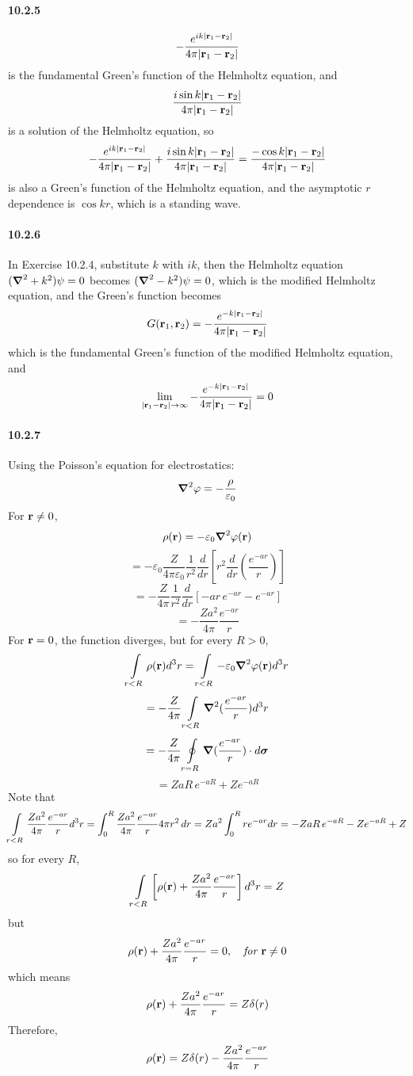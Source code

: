 \documentclass[a4paper]{article}
\begin{document}
\paragraph{10.2.5}
\[
-\frac{e^{ik|\mathbf{r}_1-\mathbf{r}_2|}}{4\pi|\mathbf{r}_1-\mathbf{r}_2|}
\]
is the fundamental Green's function of the Helmholtz equation, and
\[
\frac{i\sin k|\mathbf{r}_1-\mathbf{r}_2|}{4\pi|\mathbf{r}_1-\mathbf{r}_2|}\] 
is a solution of the Helmholtz equation, so
\[
-\frac{e^{ik|\mathbf{r}_1-\mathbf{r}_2|}}{4\pi|\mathbf{r}_1-\mathbf{r}_2|}+\frac{i\sin k|\mathbf{r}_1-\mathbf{r}_2|}{4\pi|\mathbf{r}_1-\mathbf{r}_2|}=\frac{-\cos k|\mathbf{r}_1-\mathbf{r}_2|}{4\pi|\mathbf{r}_1-\mathbf{r}_2|}
\]
is also a Green's function of the Helmholtz equation, and the asymptotic $r$ dependence is $\cos kr$, which is a standing wave.

\paragraph{10.2.6}
In Exercise 10.2.4, substitute $k$ with $ik$, then the Helmholtz equation $(\boldsymbol{\nabla}^2+k^2)\psi=0$ becomes $(\boldsymbol{\nabla}^2-k^2)\psi=0$, which is the modified Helmholtz equation, and the Green's function becomes 
\[
G(\mathbf{r}_1,\mathbf{r}_2)=-\frac{e^{-k|\mathbf{r}_1-\mathbf{r}_2|}}{4\pi|\mathbf{r}_1-\mathbf{r}_2|}
\]
which is the fundamental Green's function of the modified Helmholtz equation, and 
\[
\lim_{|\mathbf{r}_1-\mathbf{r}_2|\to\infty}-\frac{e^{-k|\mathbf{r}_1-\mathbf{r}_2|}}{4\pi|\mathbf{r}_1-\mathbf{r}_2|}=0
\]

\paragraph{10.2.7}
Using the Poisson's equation for electrostatics:
\[
\boldsymbol{\nabla}^2\varphi=-\frac{\rho}{\varepsilon_0}
\]
For $\mathbf{r}\neq0$, 
\[
\rho(\mathbf{r})=-\varepsilon_0\boldsymbol{\nabla}^2\varphi(\mathbf{r})
\]
\[=-\varepsilon_0\frac{Z}{4\pi\varepsilon_0}\frac{1}{r^2}\frac{d}{dr}\left[r^2\frac{d}{dr}(\frac{e^{-ar}}{r}) \right]
\]
\[
=-\frac{Z}{4\pi}\frac{1}{r^2}\frac{d}{dr}\left[-ar\,e^{-ar}-e^{-ar} \right]
\]
\[
=-\frac{Za^2}{4\pi}\frac{e^{-ar}}{r}
\]
For $\mathbf{r}=0$, the function diverges, but for every $R>0$,
\[
\int\displaylimits_{r<R}\rho(\mathbf{r})d^3r=\int\displaylimits_{r<R}-\varepsilon_0\boldsymbol{\nabla}^2\varphi(\mathbf{r})d^3r
\]
\[=-\frac{Z}{4\pi}\int\displaylimits_{r<R}\boldsymbol{\nabla}^2(\frac{e^{-ar}}{r})d^3r
\]
\[
=-\frac{Z}{4\pi}\oint\displaylimits_{r=R}\boldsymbol{\nabla}(\frac{e^{-ar}}{r})\cdot d\boldsymbol{\sigma}
\]
\[
=ZaR\,e^{-aR}+Ze^{-aR}
\]
Note that 
\[
\int\displaylimits_{r<R}\frac{Za^2}{4\pi}\frac{e^{-ar}}{r}d^3r=\int_0^R\frac{Za^2}{4\pi}\frac{e^{-ar}}{r}4\pi r^2\,dr=Za^2\int_0^R re^{-ar}dr=-ZaR\,e^{-aR}-Ze^{-aR}+Z
\]
so for every $R$,
\[
\int\displaylimits_{r<R}\left[\rho(\mathbf{r})+\frac{Za^2}{4\pi}\frac{e^{-ar}}{r} \right]d^3r=Z
\]
but 
\[
\rho(\mathbf{r})+\frac{Za^2}{4\pi}\frac{e^{-ar}}{r}=0, \quad \textit{for $\mathbf{r}\neq0$}
\]
which means
\[
\rho(\mathbf{r})+\frac{Za^2}{4\pi}\frac{e^{-ar}}{r}=Z\delta(r)
\]
Therefore,
\[
\rho(\mathbf{r})=Z\delta(r)-\frac{Za^2}{4\pi}\frac{e^{-ar}}{r}
\]
\end{document}
